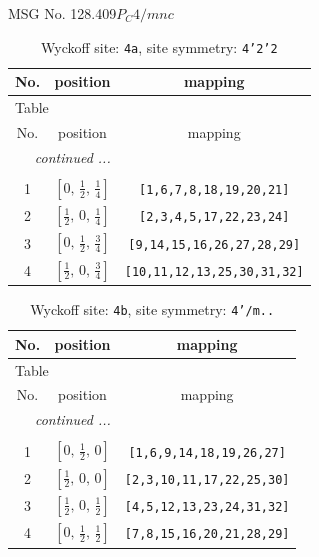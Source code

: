 \documentclass[fleqn,8pt]{jsarticle}
\begin{document}
\setcounter{MaxMatrixCols}{32}

\renewcommand{\tablename}{Table~}
\renewcommand{\figurename}{Figure~}
\begin{center}
\LARGE
MSG No. 128.409\quad$P_{C}4/mnc$
\end{center}
\renewcommand{\arraystretch}{1.2}
\begin{longtable}{ccc}
\caption{Wyckoff site: {\tt 4a}, site symmetry: {\tt 4'2'2}}
 \\
 \hline \hline
No. & position & mapping \\ \hline \endfirsthead

\multicolumn{2}{l}{\tablename\ \thetable{}} \\
 \hline \hline
No. & position & mapping \\ \hline \endhead

 \hline \hline
\multicolumn{2}{r}{\footnotesize\it continued ...} \\ \endfoot

 \hline \hline
\multicolumn{2}{r}{} \\ \endlastfoot

1 & $\left[ 0,\, \frac{1}{2},\, \frac{1}{4} \right]$ & {\tt [1,6,7,8,18,19,20,21]} \\ \hline
2 & $\left[ \frac{1}{2},\, 0,\, \frac{1}{4} \right]$ & {\tt [2,3,4,5,17,22,23,24]} \\ \hline
3 & $\left[ 0,\, \frac{1}{2},\, \frac{3}{4} \right]$ & {\tt [9,14,15,16,26,27,28,29]} \\ \hline
4 & $\left[ \frac{1}{2},\, 0,\, \frac{3}{4} \right]$ & {\tt [10,11,12,13,25,30,31,32]} \\
\end{longtable}
\renewcommand{\arraystretch}{1.2}
\begin{longtable}{ccc}
\caption{Wyckoff site: {\tt 4b}, site symmetry: {\tt 4'/m..}}
 \\
 \hline \hline
No. & position & mapping \\ \hline \endfirsthead

\multicolumn{2}{l}{\tablename\ \thetable{}} \\
 \hline \hline
No. & position & mapping \\ \hline \endhead

 \hline \hline
\multicolumn{2}{r}{\footnotesize\it continued ...} \\ \endfoot

 \hline \hline
\multicolumn{2}{r}{} \\ \endlastfoot

1 & $\left[ 0,\, \frac{1}{2},\, 0 \right]$ & {\tt [1,6,9,14,18,19,26,27]} \\ \hline
2 & $\left[ \frac{1}{2},\, 0,\, 0 \right]$ & {\tt [2,3,10,11,17,22,25,30]} \\ \hline
3 & $\left[ \frac{1}{2},\, 0,\, \frac{1}{2} \right]$ & {\tt [4,5,12,13,23,24,31,32]} \\ \hline
4 & $\left[ 0,\, \frac{1}{2},\, \frac{1}{2} \right]$ & {\tt [7,8,15,16,20,21,28,29]} \\
\end{longtable}
\end{document}
